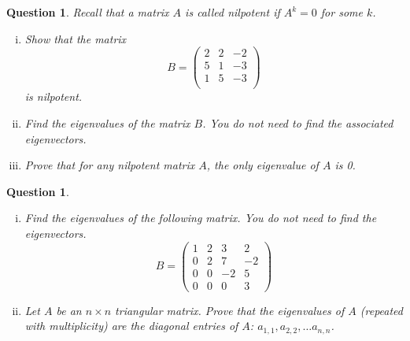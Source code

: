 \documentclass[12pt]{article}
\newtheorem{question}[thm]{Question}
\begin{document}
\begin{question}\normalfont

Recall that a matrix $A$ is called \emph{nilpotent} if $A^k=0$ for some $k$. 

\begin{enumerate}[(i)]
\item Show that the matrix 
\[
B =\begin{pmatrix}
			2 & 2 & -2\\
			5 & 1 & -3\\
			1 & 5 & -3 \\
		\end{pmatrix}
\]
is nilpotent.

\item Find the eigenvalues of the matrix $B$. You do not need to find the associated eigenvectors. 

\item Prove that for any nilpotent matrix $A$, the only eigenvalue of $A$ is 0. 
\end{enumerate}
	
	\end{question}



\vspace{1cm}

\begin{question} 
\normalfont 
\begin{enumerate}[(i)]
 
 \item Find the eigenvalues of the following matrix. You do not need to find the eigenvectors.
 \[
 B = \begin{pmatrix}
			1 & 2 & 3 & 2\\
			0 & 2 & 7 & -2\\
			0 & 0 & -2 & 5\\
			0 & 0 & 0 & 3	
		\end{pmatrix}
 \]
 \vspace{.2cm}

\item Let $A$ be an $n\times n$ triangular matrix. Prove that the eigenvalues of $A$ (repeated with multiplicity) are the diagonal entries of $A$: $a_{1,1}, a_{2,2}, \ldots a_{n,n}$. 
	\normalfont		
\end{enumerate}	
	
	\end{question}




\vspace{1cm}
\end{document}
